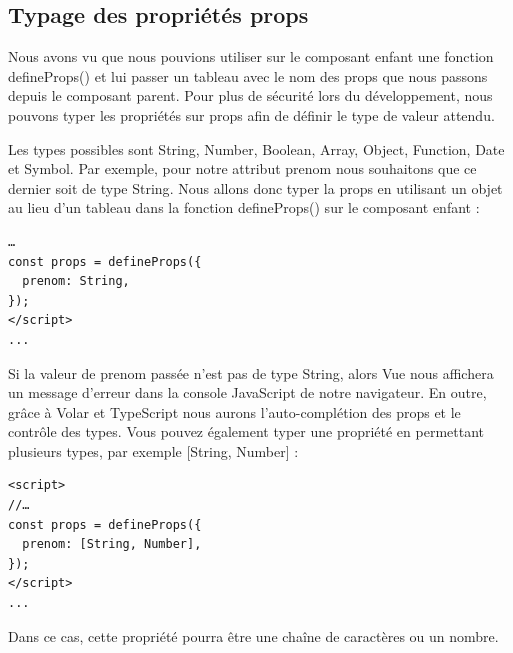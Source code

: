 \subsection{Typage des propriétés props}
Nous avons vu que nous pouvions utiliser sur le composant enfant une fonction {\color{monOrange}defineProps()} et lui passer un tableau avec le nom des {\color{monOrange}props} que nous passons depuis le composant parent. Pour plus de sécurité lors du développement, nous pouvons typer les propriétés sur {\color{monOrange}props} afin de définir le type de valeur attendu.

Les types possibles sont {\color{monOrange}String, Number, Boolean, Array, Object, Function, Date} et {\color{monOrange}Symbol}. Par exemple, pour notre attribut {\color{monOrange}prenom} nous souhaitons que ce dernier soit de type {\color{monOrange}String}. Nous allons donc typer la {\color{monOrange}props} en utilisant un objet au lieu d'un tableau dans la fonction {\color{monOrange}defineProps()} sur le composant enfant :
\begin{verbatim}
…
const props = defineProps({
  prenom: String,
});
</script>
...
\end{verbatim}
Si la valeur de {\color{monOrange}prenom} passée n'est pas de type {\color{monOrange}String}, alors {\color{monOrange}Vue} nous affichera un message d'erreur dans la console JavaScript de notre navigateur. En outre, grâce à {\color{monOrange}Volar} et {\color{monOrange}TypeScript} nous aurons l'auto-complétion des {\color{monOrange}props} et le contrôle des types. Vous pouvez également typer une propriété en permettant plusieurs types, par exemple {\color{monOrange}[String, Number]} :
\begin{verbatim}
<script>
//…
const props = defineProps({
  prenom: [String, Number],
});
</script>
...
\end{verbatim}
Dans ce cas, cette propriété pourra être une chaîne de caractères ou un nombre.

